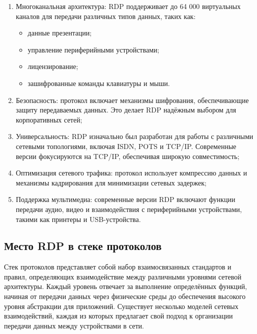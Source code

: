 \documentclass[spec, och, diploma]{SCWorks}
\begin{document}
\begin{enumerate}
  \item Многоканальная архитектура: RDP поддерживает до 64 000 виртуальных каналов для передачи различных типов данных, таких как:
  
  \begin{itemize}
    \item данные презентации;
    \item управление периферийными устройствами;
    \item лицензирование;
    \item зашифрованные команды клавиатуры и мыши.
    
  \end{itemize}
  
  \item Безопасность: протокол включает механизмы шифрования, обеспечивающие защиту передаваемых данных. Это делает RDP надёжным выбором для корпоративных сетей;
  
  \item Универсальность: RDP изначально был разработан для работы с различными сетевыми топологиями, включая ISDN, POTS и TCP/IP. Современные версии фокусируются на TCP/IP, обеспечивая широкую совместимость;
  
  \item Оптимизация сетевого трафика: протокол использует компрессию данных и механизмы кадрирования для минимизации сетевых задержек;
  
  \item Поддержка мультимедиа: современные версии RDP включают функции передачи аудио, видео и взаимодействия с периферийными устройствами, такими как принтеры и USB-устройства.
\end{enumerate}


\subsection{Место RDP в стеке протоколов}

Стек протоколов представляет собой набор взаимосвязанных стандартов и правил, определяющих взаимодействие между различными уровнями сетевой 
архитектуры. Каждый уровень отвечает за выполнение определённых функций, начиная от передачи данных через физические среды до обеспечения 
высокого уровня абстракции для приложений. Существует несколько моделей сетевых взаимодействий, каждая из которых предлагает свой подход 
к организации передачи данных между устройствами в сети.
\end{document}
